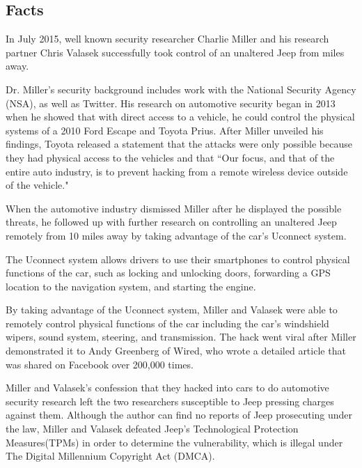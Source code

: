 \documentclass[12pt]{article}
\begin{document}
\tableofcontents
\newpage
\begin{multicols}{2}

\section{Facts}

In July 2015, well known security researcher Charlie Miller and his research partner Chris Valasek successfully took control of an unaltered Jeep from miles away. \cite{wired}

Dr. Miller's security background includes work with the National Security Agency (NSA), as well as Twitter. \cite{linkedin} His  research on automotive security began in 2013 when he showed that with direct access to a vehicle, he could control the physical systems of a 2010 Ford Escape and Toyota Prius. \cite{officialPaper} After Miller unveiled his findings, Toyota released a statement that the attacks were only possible because they had physical access to the vehicles and that ``Our focus, and that of the entire auto industry, is to prevent hacking from a remote wireless device outside of the vehicle." \cite{originalHack}

When the automotive industry dismissed Miller after he displayed the possible threats, he followed up with further research on controlling an unaltered Jeep remotely from 10 miles away by taking advantage of the car's Uconnect system. \cite{officialPaper} 

The Uconnect system allows drivers to use their smartphones to control physical functions of the car, such as locking and unlocking doors, forwarding a GPS location to the navigation system, and starting the engine.\cite{uconnect} 

By taking advantage of the Uconnect system, Miller and Valasek were able to remotely control physical functions of the car including the car's windshield wipers, sound system, steering, and transmission. \cite{wired} The hack went viral after Miller demonstrated it to Andy Greenberg of Wired, who wrote a detailed article that was shared on Facebook over 200,000 times.\cite{wired}

Miller and Valasek's confession that they hacked into cars to do automotive security research left the two researchers susceptible to Jeep pressing charges against them. \cite{brokeDMCA} Although the author can find no reports of Jeep prosecuting under the law, Miller and Valasek defeated Jeep's Technological Protection Measures(TPMs) in order to determine the vulnerability, which is illegal under The Digital Millennium Copyright Act (DMCA).\cite{DMCA} 


\end{multicols}
\end{document}
